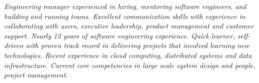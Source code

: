 {\selectfont
\textit{Engineering manager experienced in hiring, mentoring software engineers, and building and running teams. Excellent communication skills with experience in collaborating with users, executive leadership, product management and customer support. Nearly 12 years of software engineering experience. Quick learner, self-driven with proven track record in delivering projects that involved learning new technologies. Recent experience in cloud computing, distributed systems and data infrastructure. Current core competencies in large scale system design and people, project management.}
}
